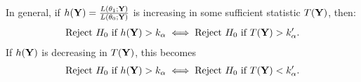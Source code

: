 In general, if $h(\mathbf Y)=\frac{L(\theta_1;\mathbf Y)}{L(\theta_0;\mathbf Y)}$ is 
increasing in some sufficient statistic $T(\mathbf Y)$, then:
\begin{align*}
	\text{Reject $H_0$ if } h(\mathbf Y)>k_\alpha \;\Longleftrightarrow\; \text{Reject $H_0$ if } T(\mathbf Y)>k_\alpha' 
.\end{align*}
If $h(\mathbf Y)$ is decreasing in $T(\mathbf Y)$, this becomes 
\begin{align*}
	\text{Reject } H_0 \text{ if } h(\mathbf Y)>k_\alpha \;\Longleftrightarrow\;  \text{Reject $H_0$ if } T(\mathbf Y)<k_{\alpha}'.
\end{align*}
